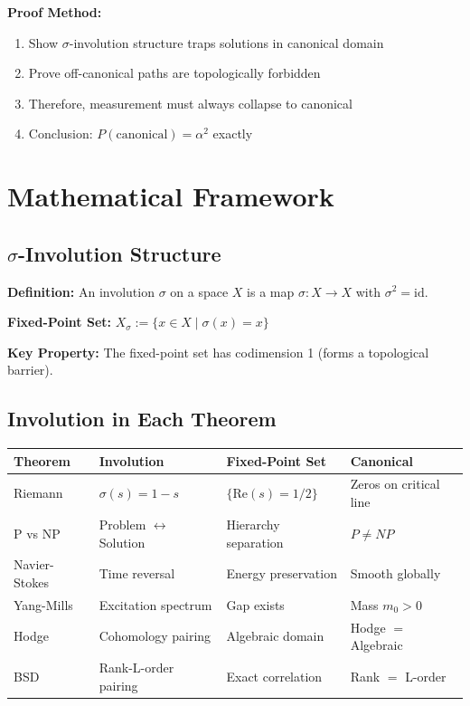 \documentclass[11pt]{article}
\begin{document}
\textbf{Proof Method:}
\begin{enumerate}
\item Show $\sigma$-involution structure traps solutions in canonical domain
\item Prove off-canonical paths are topologically forbidden
\item Therefore, measurement must always collapse to canonical
\item Conclusion: $P(\text{canonical}) = \alpha^2$ exactly
\end{enumerate}

\section{Mathematical Framework}

\subsection{$\sigma$-Involution Structure}

\textbf{Definition:} An involution $\sigma$ on a space $X$ is a map $\sigma: X \to X$ with $\sigma^2 = \text{id}$.

\textbf{Fixed-Point Set:} $X_\sigma := \{x \in X \mid \sigma(x) = x\}$

\textbf{Key Property:} The fixed-point set has codimension 1 (forms a topological barrier).

\subsection{Involution in Each Theorem}

\begin{center}
\begin{tabular}{|l|l|l|l|}
\hline
\textbf{Theorem} & \textbf{Involution} & \textbf{Fixed-Point Set} & \textbf{Canonical} \\
\hline
Riemann & $\sigma(s) = 1-s$ & $\{\text{Re}(s)=1/2\}$ & Zeros on critical line \\
P vs NP & Problem $\leftrightarrow$ Solution & Hierarchy separation & $P \neq NP$ \\
Navier-Stokes & Time reversal & Energy preservation & Smooth globally \\
Yang-Mills & Excitation spectrum & Gap exists & Mass $m_0 > 0$ \\
Hodge & Cohomology pairing & Algebraic domain & Hodge $=$ Algebraic \\
BSD & Rank-L-order pairing & Exact correlation & Rank $=$ L-order \\
\hline
\end{tabular}
\end{center}
\end{document}

